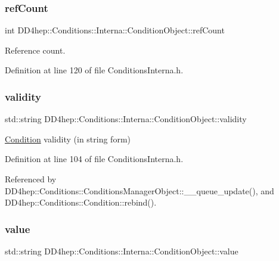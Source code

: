 \subsubsection{\texorpdfstring{ref\+Count}{refCount}}
{\footnotesize\ttfamily int D\+D4hep\+::\+Conditions\+::\+Interna\+::\+Condition\+Object\+::ref\+Count}



Reference count. 



Definition at line 120 of file Conditions\+Interna.\+h.

\hypertarget{class_d_d4hep_1_1_conditions_1_1_interna_1_1_condition_object_a7f4bcc75be5d565396e3f09c91a23ede}{}\label{class_d_d4hep_1_1_conditions_1_1_interna_1_1_condition_object_a7f4bcc75be5d565396e3f09c91a23ede} 
\subsubsection{\texorpdfstring{validity}{validity}}
{\footnotesize\ttfamily std\+::string D\+D4hep\+::\+Conditions\+::\+Interna\+::\+Condition\+Object\+::validity}



\hyperlink{class_d_d4hep_1_1_conditions_1_1_condition}{Condition} validity (in string form) 



Definition at line 104 of file Conditions\+Interna.\+h.



Referenced by D\+D4hep\+::\+Conditions\+::\+Conditions\+Manager\+Object\+::\+\_\+\+\_\+queue\+\_\+update(), and D\+D4hep\+::\+Conditions\+::\+Condition\+::rebind().

\hypertarget{class_d_d4hep_1_1_conditions_1_1_interna_1_1_condition_object_a0b82a44322c732c5f5b99123eef28f63}{}\label{class_d_d4hep_1_1_conditions_1_1_interna_1_1_condition_object_a0b82a44322c732c5f5b99123eef28f63} 
\subsubsection{\texorpdfstring{value}{value}}
{\footnotesize\ttfamily std\+::string D\+D4hep\+::\+Conditions\+::\+Interna\+::\+Condition\+Object\+::value}



